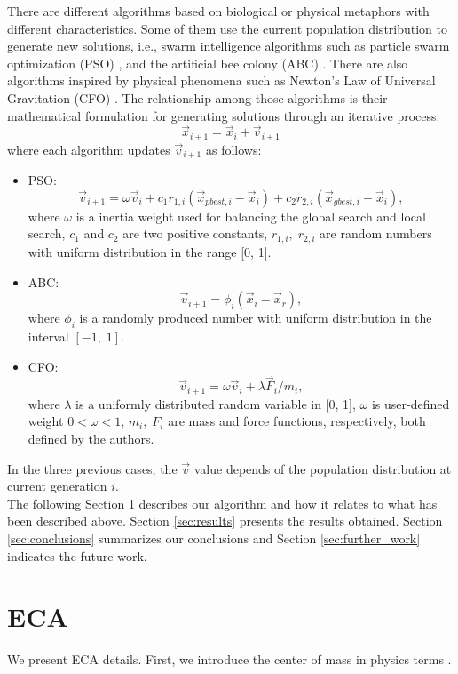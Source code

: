\documentclass[graybox]{svmult}
\begin{document}
There are different algorithms based on biological or physical metaphors with 
different characteristics. Some of them use the current population distribution 
to generate new solutions, i.e., swarm intelligence algorithms such as particle 
swarm optimization (PSO) \cite{pso1995}, and the artificial bee colony (ABC) \cite{abc2005}. 
There are also algorithms inspired by physical phenomena such as Newton's Law of 
Universal Gravitation (CFO) \cite{fisicaSurvey, cfo2007}. The relationship among those  
algorithms  is their mathematical formulation for generating solutions 
through an iterative process:
%
\begin{equation}
	\vec{x}_{i + 1} = \vec{x}_{i} + \vec{v}_{i + 1}
	\label{eqn:xxv}
\end{equation}
%
where each algorithm updates $\vec{v}_{i+1} $ as follows:
\begin{itemize}
	\item PSO:
		$$
			\vec{v}_{i + 1} = \omega \vec{v}_{i} +  
					c_1 r_{1, i} ( \vec{x}_{pbest, i} - \vec{x}_i ) + 
					c_2 r_{2, i} ( \vec{x}_{gbest, i} - \vec{x}_i ),
		$$
		where $\omega$ is a inertia weight used for balancing the global search 
		and local search, $c_1$ and $c_2$ are two positive constants, $r_{1, i},\; r_{2, i}$ 
		are random numbers with uniform distribution in the range [0, 1].
	\item ABC:
		$$
			\vec{v}_{i + 1} = \phi_i (\vec{x}_i - \vec{x}_{r}),
		$$
	where $\phi_i$ is a randomly produced number with uniform distribution 
	in the interval $[-1,\;1]$.
	\item CFO: $$
		\vec{v}_{i + 1} = \omega \vec{v}_{i} + {\lambda \vec{F}_{i}} / {m_i},
		$$
		where $\lambda$ is a uniformly distributed random variable in [0, 1], $\omega$ 
		is user-defined weight $0 < \omega < 1$, $m_i,\; F_i$ are mass and force 
		functions, respectively, both defined by the authors.
\end{itemize}
%
%
In the three previous cases, the $\vec{v}$ value  depends of the population 
distribution at current generation $i$.\\

The following Section \ref{sec:eca} describes our algorithm and how it 
relates to what has been  described above. Section \ref{sec:results} 
presents the results obtained.  Section \ref{sec:conclusions} summarizes 
our conclusions and Section \ref{sec:further_work}  indicates the future work. 

\section{ECA} %
\label{sec:eca}
%
%
We present ECA details. First, we introduce the center of mass in physics 
terms \cite{kleppner73,serway}.
\end{document}
